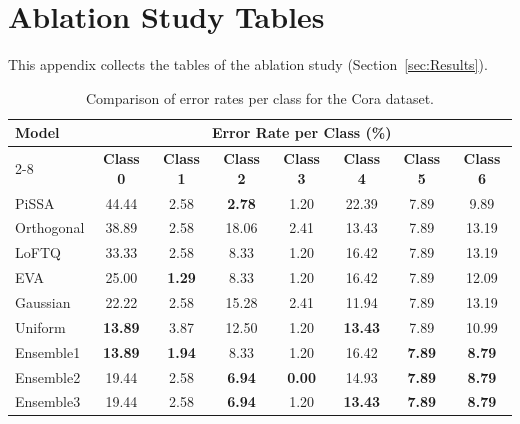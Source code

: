 \documentclass[a4paper,fleqn]{cas-sc}
\begin{document}
\clearpage
\section{Ablation Study Tables}\label{app:ablation_tables}

This appendix collects the tables of the ablation study (Section~\ref{sec:Results}).

\begin{table}[ht]
\centering
\caption{Comparison of error rates per class for the Cora dataset.}
\label{tab:error_rates}

\begin{tabular*}{\textwidth}{@{\extracolsep{\fill}} lccccccc @{}}
\toprule
\multirow{2}{*}{\textbf{Model}} & \multicolumn{7}{c}{\textbf{Error Rate per Class (\%)}} \\
\cmidrule(lr){2-8}
 & \textbf{Class 0} & \textbf{Class 1} & \textbf{Class 2} & \textbf{Class 3} & \textbf{Class 4} & \textbf{Class 5} & \textbf{Class 6} \\
\midrule

PiSSA      & 44.44 & 2.58 & \textbf{2.78} & 1.20 & 22.39 & 7.89 & 9.89 \\
Orthogonal & 38.89 & 2.58 & 18.06 & 2.41 & 13.43 & 7.89 & 13.19 \\
LoFTQ      & 33.33 & 2.58 & 8.33 & 1.20 & 16.42 & 7.89 & 13.19 \\
EVA        & 25.00 & \textbf{1.29} & 8.33 & 1.20 & 16.42 & 7.89 & 12.09 \\
Gaussian   & 22.22 & 2.58 & 15.28 & 2.41 & 11.94 & 7.89 & 13.19 \\
\midrule
Uniform    & \textbf{13.89} & 3.87 & 12.50 & 1.20 & \textbf{13.43} & 7.89 & 10.99 \\
\midrule
Ensemble1  & \textbf{13.89} & \textbf{1.94} & 8.33 & 1.20 & 16.42 & \textbf{7.89} & \textbf{8.79} \\
Ensemble2  & 19.44 & 2.58 & \textbf{6.94} & \textbf{0.00} & 14.93 & \textbf{7.89} & \textbf{8.79} \\
Ensemble3  & 19.44 & 2.58 & \textbf{6.94} & 1.20 & \textbf{13.43} & \textbf{7.89} & \textbf{8.79} \\
\bottomrule
\end{tabular*}
\end{table}
\end{document}
